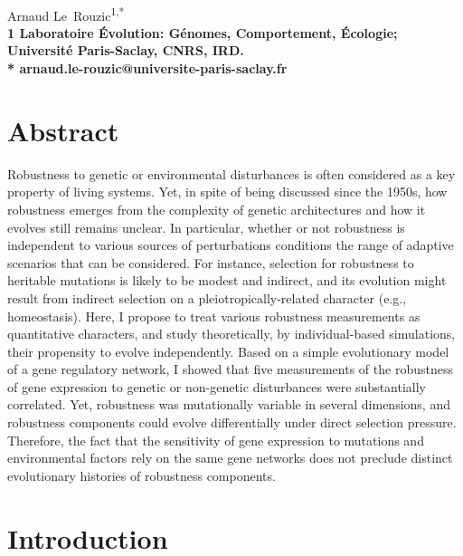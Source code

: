\documentclass[10pt,a4paper]{article}
\title{}
\date{}
\begin{document}
\vspace*{0.35in}

\begin{flushleft}
{\Large
\textbf{}
}
\newline
\\
Arnaud Le~Rouzic\textsuperscript{1,*}
\\
\bigskip
\bf{1} Laboratoire Évolution: Génomes, Comportement, Écologie; Université Paris-Saclay, CNRS, IRD.
\\
\bigskip
* arnaud.le-rouzic@universite-paris-saclay.fr

\end{flushleft}

\section*{Abstract}

Robustness to genetic or environmental disturbances is often considered as a key property of living systems. Yet, in spite of being discussed since the 1950s, how robustness emerges from the complexity of genetic architectures and how it evolves still remains unclear. In particular, whether or not robustness is independent to various sources of perturbations conditions the range of adaptive scenarios that can be considered. For instance, selection for robustness to heritable mutations is likely to be modest and indirect, and its evolution might result from indirect selection on a pleiotropically-related character (e.g., homeostasis). Here, I propose to treat various robustness measurements as quantitative characters, and study theoretically, by individual-based simulations, their propensity to evolve independently. Based on a simple evolutionary model of a gene regulatory network, I showed that five measurements of the robustness of gene expression to genetic or non-genetic disturbances were substantially correlated. Yet, robustness was mutationally variable in several dimensions, and robustness components could evolve differentially under direct selection pressure. Therefore, the fact that the sensitivity of gene expression to mutations and environmental factors rely on the same gene networks does not preclude distinct evolutionary histories of robustness components.


\section{Introduction}
\end{document}
